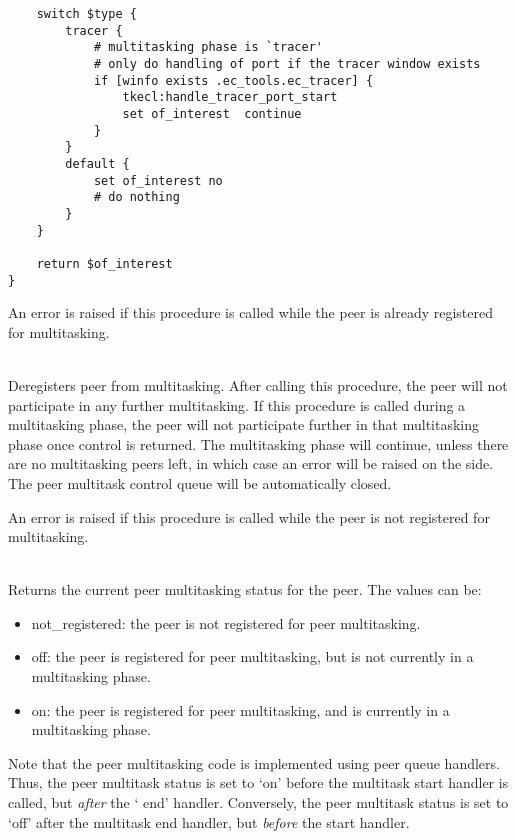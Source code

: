 \begin{description}
\begin{verbatim}
    switch $type {
        tracer {
            # multitasking phase is `tracer'
            # only do handling of port if the tracer window exists
            if [winfo exists .ec_tools.ec_tracer] {
                tkecl:handle_tracer_port_start
                set of_interest  continue
            }
        }
        default {
            set of_interest no
            # do nothing
        }
    }

    return $of_interest
}

\end{verbatim}

An error is raised if this procedure is called while the peer is already
registered for multitasking.

\item[\index{ec_multi:peer_deregister (Tcl peer multitasking)}{\bf
    ec_multi:peer_deregister}] \ \\
      Deregisters peer from multitasking. After calling this procedure, the
      peer will not participate in any further multitasking. If this
      procedure is called during a multitasking phase, the peer will not
      participate further in that multitasking phase once control is
      returned. The multitasking phase will continue, unless there are no
      multitasking peers left, in which case an error will be raised on the 
      {\eclipse} side. The peer multitask control queue will be
      automatically closed.

      An error is raised if this procedure is called while the peer is
      not registered for multitasking.

\item[\index{ec_multi:get_multi_status (Tcl peer multitasking)}{\bf
    ec_multi:get_multi_status}] \ \\
      Returns the current peer multitasking status for the peer. The values
    can be:
\begin{itemize}
\item not_registered: the peer is not registered for peer multitasking.
\item off: the peer is registered for peer multitasking, but is not
  currently in a multitasking phase.
\item on: the peer is registered for peer multitasking, and is currently in
  a multitasking phase.
\end{itemize}

Note that the peer multitasking code is implemented using peer queue
handlers. Thus, the peer multitask status is set to `on'  
before the multitask start handler is called, but {\it after\/} the
`{\eclipse} end' handler.
Conversely, the peer multitask status is set to
`off' after the multitask end handler, but {\it before\/} the {\eclipse}
start handler.
\end{description}

